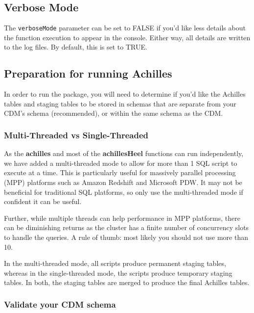 \documentclass[]{article}
\begin{document}
\subsection{Verbose Mode}\label{verbose-mode}

The \texttt{verboseMode} parameter can be set to FALSE if you'd like
less details about the function execution to appear in the console.
Either way, all details are written to the log files. By default, this
is set to TRUE.

\subsection{Preparation for running
Achilles}\label{preparation-for-running-achilles}

In order to run the package, you will need to determine if you'd like
the Achilles tables and staging tables to be stored in schemas that are
separate from your CDM's schema (recommended), or within the same schema
as the CDM.

\subsubsection{Multi-Threaded vs
Single-Threaded}\label{multi-threaded-vs-single-threaded}

As the \textbf{achilles} and most of the \textbf{achillesHeel} functions
can run independently, we have added a multi-threaded mode to allow for
more than 1 SQL script to execute at a time. This is particularly useful
for massively parallel processing (MPP) platforms such as Amazon
Redshift and Microsoft PDW. It may not be beneficial for traditional SQL
platforms, so only use the multi-threaded mode if confident it can be
useful.

Further, while multiple threads can help performance in MPP platforms,
there can be diminishing returns as the cluster has a finite number of
concurrency slots to handle the queries. A rule of thumb: most likely
you should not use more than 10.

In the multi-threaded mode, all scripts produce permanent staging
tables, whereas in the single-threaded mode, the scripts produce
temporary staging tables. In both, the staging tables are merged to
produce the final Achilles tables.

\subsubsection{Validate your CDM schema}\label{validate-your-cdm-schema}
\end{document}
